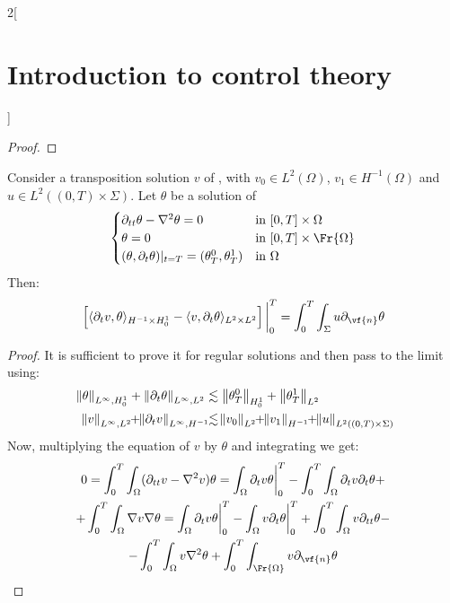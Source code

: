\documentclass[../../../main_math.tex]{subfiles}
\begin{document}
\begin{multicols}{2}[\section{Introduction to control theory}]
\begin{proof}
  \end{proof}
  \begin{proposition}
    Consider a transposition solution $v$ of , with $v_0\in L^2(\Omega)$, $v_1\in H^{-1}(\Omega)$ and $u\in L^2((0,T)\times \Sigma)$. Let $\theta$ be a solution of
    \begin{equation}\label{ICT:wave_equation_control_dual2}
      \begin{cases}
        \partial_{tt} \theta - \laplacian \theta =0                 & \text{in } [0,T]\times \Omega      \\
        \theta = 0                                                  & \text{in } [0,T]\times \Fr{\Omega} \\
        (\theta,\partial_t \theta)|_{t=T} = (\theta_T^0,\theta_T^1) & \text{in } \Omega
      \end{cases}
    \end{equation}
    Then:
    $$
      \left[\langle \partial_tv,\theta\rangle_{H^{-1}\times H_0^1}-\langle v,\partial_t\theta\rangle_{L^2\times L^2}\right]\bigg|_0^T = \int_0^T\int_\Sigma u\partial_{\vf{n}}\theta
    $$
  \end{proposition}
  \begin{proof}
    It is sufficient to prove it for regular solutions and then pass to the limit using:
    \begin{align*}
      \norm{\theta}_{L^\infty, H_0^1} + \norm{\partial_t\theta}_{L^\infty, L^2}   & \lesssim \norm{\theta_T^0}_{H_0^1} + \norm{\theta_T^1}_{L^2}                                             \\
      \norm{v}_{L^\infty, L^2}\!\!+\!\!\norm{\partial_t v}_{L^\infty, H^{-1}}\!\! & \lesssim \!\norm{v_0}_{L^2} \!\!+\!\! \norm{v_1}_{H^{-1}}\!\!+\!\!\norm{u}_{L^2((0,T)\times \Sigma)}\!\!
    \end{align*}
    Now, multiplying the equation of $v$ by $\theta$ and integrating we get:
    \begin{multline*}
      0 = \int_0^T\int_\Omega (\partial_{tt}v -\laplacian v)\theta= \int_\Omega \partial_t v\theta\bigg|_0^T - \int_0^T\int_\Omega \partial_t v\partial_t\theta +\\+ \int_0^T\int_\Omega \nabla v \nabla \theta= \int_\Omega \partial_t v\theta\bigg|_0^T - \int_\Omega v \partial_t\theta\bigg|_0^T + \int_0^T\int_\Omega v \partial_{tt} \theta -\\- \int_0^T\int_\Omega v \laplacian \theta + \int_0^T\int_{\Fr{\Omega}} v\partial_{\vf{n}}\theta
    \end{multline*}

\end{proof}
\end{multicols}
\end{document}
